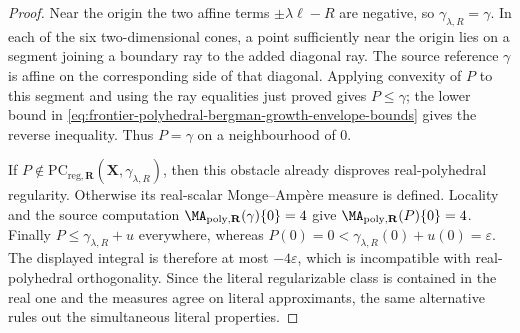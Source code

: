 \begin{proof}
Near the origin the two affine terms \(\pm\lambda\ell-R\) are negative,
so \(\gamma_{\lambda,R}=\gamma\).  In each of the six two-dimensional
cones, a point sufficiently near the origin lies on a segment joining a
boundary ray to the added diagonal ray.  The source reference \(\gamma\)
is affine on the corresponding side of that diagonal.  Applying convexity
of \(P\) to this segment and using the ray equalities just proved gives
\(P\leq\gamma\); the lower bound in
\eqref{eq:frontier-polyhedral-bergman-growth-envelope-bounds} gives the
reverse inequality.  Thus \(P=\gamma\) on a neighbourhood of \(0\).

If
\(P\notin\mathrm{PC}_{\mathrm{reg},\mathbf R}
(\mathbf X,\gamma_{\lambda,R})\), then this obstacle already disproves
real-polyhedral regularity.  Otherwise its real-scalar Monge--Amp\`ere
measure is defined.  Locality and the source computation
\(\MA_{\mathrm{poly},\mathbf R}(\gamma)\{0\}=4\) give
\(\MA_{\mathrm{poly},\mathbf R}(P)\{0\}=4\).  Finally \(P\leq
\gamma_{\lambda,R}+u\) everywhere, whereas
\(P(0)=0<\gamma_{\lambda,R}(0)+u(0)=\varepsilon\).  The displayed
integral is therefore at most \(-4\varepsilon\), which is incompatible
with real-polyhedral orthogonality.  Since the literal regularizable class
is contained in the real one and the measures agree on literal
approximants, the same alternative rules out the simultaneous literal
properties.
\end{proof}